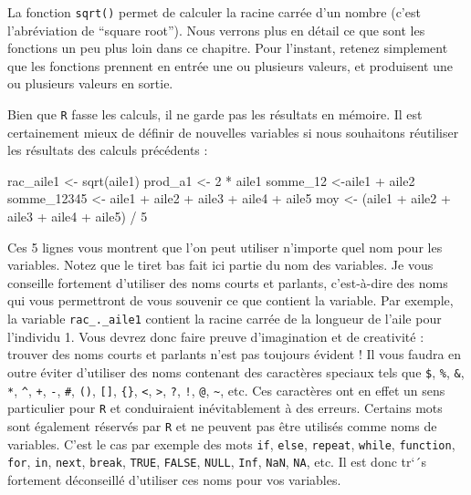 \documentclass[
  a4paper,
  DIV=11,
  numbers=noendperiod,
  oneside]{scrreprt}
\newenvironment{Shaded}{}{}
\newcommand{\DecValTok}[1]{\textcolor[rgb]{0.00,0.36,0.77}{#1}}
\newcommand{\FunctionTok}[1]{\textcolor[rgb]{0.44,0.26,0.76}{#1}}
\newcommand{\NormalTok}[1]{\textcolor[rgb]{0.14,0.16,0.18}{#1}}
\newcommand{\OtherTok}[1]{\textcolor[rgb]{0.44,0.26,0.76}{#1}}
\newcommand{\SpecialCharTok}[1]{\textcolor[rgb]{0.00,0.36,0.77}{#1}}
\begin{document}
La fonction \texttt{sqrt()} permet de calculer la racine carrée d'un
nombre (c'est l'abréviation de ``square root''). Nous verrons plus en
détail ce que sont les fonctions un peu plus loin dans ce chapitre. Pour
l'instant, retenez simplement que les fonctions prennent en entrée une
ou plusieurs valeurs, et produisent une ou plusieurs valeurs en sortie.

Bien que \texttt{R} fasse les calculs, il ne garde pas les résultats en
mémoire. Il est certainement mieux de définir de nouvelles variables si
nous souhaitons réutiliser les résultats des calculs précédents :

\begin{Shaded}
\begin{Highlighting}[]
\NormalTok{rac\_aile1 }\OtherTok{\textless{}{-}} \FunctionTok{sqrt}\NormalTok{(aile1)}
\NormalTok{prod\_a1 }\OtherTok{\textless{}{-}} \DecValTok{2} \SpecialCharTok{*}\NormalTok{ aile1}
\NormalTok{somme\_12 }\OtherTok{\textless{}{-}}\NormalTok{aile1 }\SpecialCharTok{+}\NormalTok{ aile2}
\NormalTok{somme\_12345 }\OtherTok{\textless{}{-}}\NormalTok{ aile1 }\SpecialCharTok{+}\NormalTok{ aile2 }\SpecialCharTok{+}\NormalTok{ aile3 }\SpecialCharTok{+}\NormalTok{ aile4 }\SpecialCharTok{+}\NormalTok{ aile5}
\NormalTok{moy }\OtherTok{\textless{}{-}}\NormalTok{ (aile1 }\SpecialCharTok{+}\NormalTok{ aile2 }\SpecialCharTok{+}\NormalTok{ aile3 }\SpecialCharTok{+}\NormalTok{ aile4 }\SpecialCharTok{+}\NormalTok{ aile5) }\SpecialCharTok{/} \DecValTok{5}
\end{Highlighting}
\end{Shaded}

Ces 5 lignes vous montrent que l'on peut utiliser n'importe quel nom
pour les variables. Notez que le tiret bas fait ici partie du nom des
variables. Je vous conseille fortement d'utiliser des noms courts et
parlants, c'est-à-dire des noms qui vous permettront de vous souvenir ce
que contient la variable. Par exemple, la variable
\texttt{rac\_.\_aile1} contient la racine carrée de la longueur de
l'aile pour l'individu 1. Vous devrez donc faire preuve d'imagination et
de creativité : trouver des noms courts et parlants n'est pas toujours
évident ! Il vous faudra en outre éviter d'utiliser des noms contenant
des caractères speciaux tels que \texttt{\$}, \texttt{\%}, \texttt{\&},
\texttt{*}, \texttt{\^{}}, \texttt{+}, \texttt{-}, \texttt{\#},
\texttt{()}, \texttt{{[}{]}}, \texttt{\{\}}, \texttt{\textless{}},
\texttt{\textgreater{}}, \texttt{?}, \texttt{!}, \texttt{@},
\texttt{\textasciitilde{}}, etc. Ces caractères ont en effet un sens
particulier pour \texttt{R} et conduiraient inévitablement à des
erreurs. Certains mots sont également réservés par \texttt{R} et ne
peuvent pas être utilisés comme noms de variables. C'est le cas par
exemple des mots \texttt{if}, \texttt{else}, \texttt{repeat},
\texttt{while}, \texttt{function}, \texttt{for}, \texttt{in},
\texttt{next}, \texttt{break}, \texttt{TRUE}, \texttt{FALSE},
\texttt{NULL}, \texttt{Inf}, \texttt{NaN}, \texttt{NA}, etc. Il est donc
tr`´s fortement déconseillé d'utiliser ces noms pour vos variables.
\end{document}
